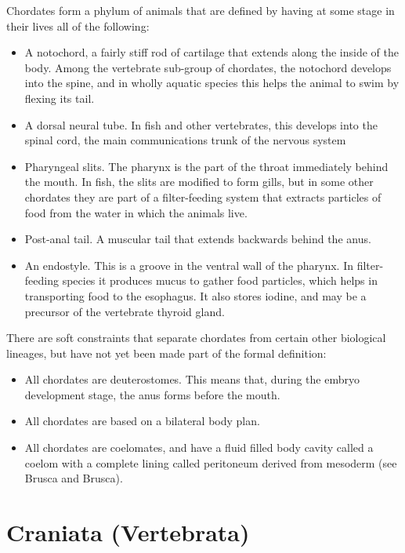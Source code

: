 \documentclass[]{book}
\providecommand{\tightlist}{%
  \setlength{\itemsep}{0pt}\setlength{\parskip}{0pt}}
\begin{document}
Chordates form a phylum of animals that are defined by having at some stage in their lives all of the following:

\begin{itemize}
\tightlist
\item
  A notochord, a fairly stiff rod of cartilage that extends along the inside of the body. Among the vertebrate sub-group of chordates, the notochord develops into the spine, and in wholly aquatic species this helps the animal to swim by flexing its tail.
\item
  A dorsal neural tube. In fish and other vertebrates, this develops into the spinal cord, the main communications trunk of the nervous system
\item
  Pharyngeal slits. The pharynx is the part of the throat immediately behind the mouth. In fish, the slits are modified to form gills, but in some other chordates they are part of a filter-feeding system that extracts particles of food from the water in which the animals live.
\item
  Post-anal tail. A muscular tail that extends backwards behind the anus.
\item
  An endostyle. This is a groove in the ventral wall of the pharynx. In filter-feeding species it produces mucus to gather food particles, which helps in transporting food to the esophagus. It also stores iodine, and may be a precursor of the vertebrate thyroid gland.
\end{itemize}

There are soft constraints that separate chordates from certain other biological lineages, but have not yet been made part of the formal definition:

\begin{itemize}
\tightlist
\item
  All chordates are deuterostomes. This means that, during the embryo development stage, the anus forms before the mouth.
\item
  All chordates are based on a bilateral body plan.
\item
  All chordates are coelomates, and have a fluid filled body cavity called a coelom with a complete lining called peritoneum derived from mesoderm (see Brusca and Brusca).
\end{itemize}

\hypertarget{craniata-vertebrata}{%
\section{Craniata (Vertebrata)}\label{craniata-vertebrata}}
\end{document}
